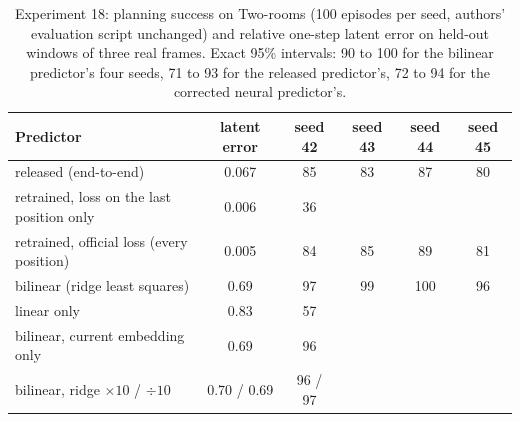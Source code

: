 \documentclass[11pt,a4paper]{article}
\begin{document}
\begin{table}[h]
\centering\small\setlength{\tabcolsep}{5pt}
\begin{tabular}{lccccc}
\toprule
Predictor & latent error & seed 42 & seed 43 & seed 44 & seed 45 \\
\midrule
released (end-to-end) & 0.067 & 85 & 83 & 87 & 80 \\
retrained, loss on the last position only & 0.006 & 36 & & & \\
retrained, official loss (every position) & 0.005 & 84 & 85 & 89 & 81 \\
bilinear (ridge least squares) & 0.69 & 97 & 99 & 100 & 96 \\
linear only & 0.83 & 57 & & & \\
bilinear, current embedding only & 0.69 & 96 & & & \\
bilinear, ridge $\times 10$ / $\div 10$ & 0.70 / 0.69 & 96 / 97 & & & \\
\bottomrule
\end{tabular}
\caption{Experiment 18: planning success on Two-rooms (100 episodes per seed, authors' evaluation script unchanged) and relative one-step latent error on held-out windows of three real frames. Exact 95\% intervals: 90 to 100 for the bilinear predictor's four seeds, 71 to 93 for the released predictor's, 72 to 94 for the corrected neural predictor's.}
\label{tab:exp18}
\end{table}
\end{document}
